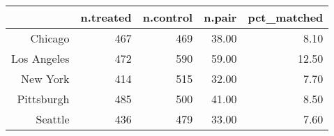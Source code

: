 \begin{table}[ht]
\centering
\begin{tabular}{rrrrr}
  \hline
 & n.treated & n.control & n.pair & pct\_matched \\ 
  \hline
Chicago & 467 & 469 & 38.00 & 8.10 \\ 
  Los Angeles & 472 & 590 & 59.00 & 12.50 \\ 
  New York & 414 & 515 & 32.00 & 7.70 \\ 
  Pittsburgh & 485 & 500 & 41.00 & 8.50 \\ 
  Seattle & 436 & 479 & 33.00 & 7.60 \\ 
   \hline
\end{tabular}
\end{table}
